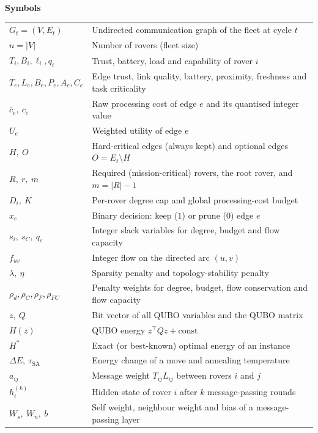 \begin{singlespace}
\vspace{6pt}
\noindent\textbf{Symbols}
\vspace{4pt}

\begin{longtable}{@{}p{3.8cm}p{10.4cm}@{}}
$G_t=(V,E_t)$ & Undirected communication graph of the fleet at cycle $t$ \\
$n=|V|$ & Number of rovers (fleet size) \\
$T_i,B_i,\ell_i,q_i$ & Trust, battery, load and capability of rover $i$ \\
$T_e,L_e,B_e,P_e,A_e,C_e$ & Edge trust, link quality, battery, proximity, freshness and task criticality \\
$\bar c_e,\ c_e$ & Raw processing cost of edge $e$ and its quantised integer value \\
$U_e$ & Weighted utility of edge $e$ \\
$H,\ O$ & Hard-critical edges (always kept) and optional edges $O=E_t\setminus H$ \\
$R,\ r,\ m$ & Required (mission-critical) rovers, the root rover, and $m=|R|-1$ \\
$D_i,\ K$ & Per-rover degree cap and global processing-cost budget \\
$x_e$ & Binary decision: keep ($1$) or prune ($0$) edge $e$ \\
$s_i,\ s_C,\ q_e$ & Integer slack variables for degree, budget and flow capacity \\
$f_{uv}$ & Integer flow on the directed arc $(u,v)$ \\
$\lambda,\ \eta$ & Sparsity penalty and topology-stability penalty \\
$\rho_d,\rho_C,\rho_F,\rho_{FC}$ & Penalty weights for degree, budget, flow conservation and flow capacity \\
$z,\ Q$ & Bit vector of all QUBO variables and the QUBO matrix \\
$H(z)$ & QUBO energy $z^{\top}Qz+\mathrm{const}$ \\
$H^{*}$ & Exact (or best-known) optimal energy of an instance \\
$\Delta E,\ \tau_{\mathrm{SA}}$ & Energy change of a move and annealing temperature \\
$a_{ij}$ & Message weight $T_{ij}L_{ij}$ between rovers $i$ and $j$ \\
$h_i^{(k)}$ & Hidden state of rover $i$ after $k$ message-passing rounds \\
$W_s,\ W_n,\ b$ & Self weight, neighbour weight and bias of a message-passing layer \\

\end{longtable}
\end{singlespace}
